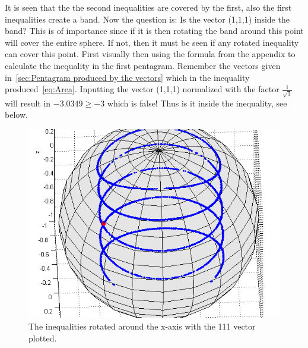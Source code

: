 \documentclass[
  utf8,%
  parskip,%
  largesmallcaps,intlimits,widermath,%
  sharecounter,nobreak,definition=marks,%
  noparts%
]{rtthesis}
\begin{document}
It is seen that the the second inequalities are covered by the first, also the first inequalities create a band. Now the question is: Is the vector (1,1,1) inside the band? This is of importance since if it is then rotating the band around this point will cover the entire sphere. If not, then it must be seen if any rotated inequality can cover this point. First visually then using the formula from the appendix to calculate the inequality in the first pentagram. Remember the vectors given in~\ref{sec:Pentagram produced by the vectors} which in the inequality produced~\eqref{eq:Area}. Inputting the vector (1,1,1) normalized with the factor $\frac{1}{\sqrt{3}}$ will result in $-3.0349 \geq -3$ which is false! Thus is it inside the inequality, see below.
\begin{figure}[H]
\begin{center}
\includegraphics[scale=0.5]{ine12all111.png}
\caption{The inequalities rotated around the x-axis with the 111 vector plotted.}
\label{fig:ine12all111}
\end{center}
\end{figure}
\end{document}
